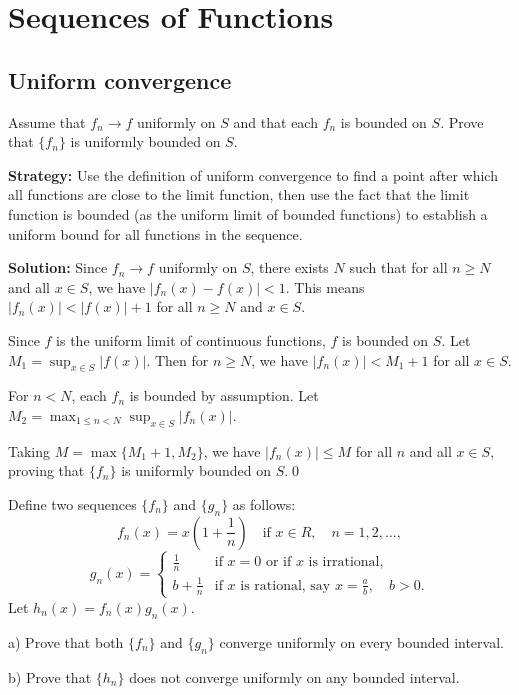 \chapter{Sequences of Functions}

\section{Uniform convergence}



\begin{problembox}
Assume that \( f_n \to f \) uniformly on \( S \) and that each \( f_n \) is bounded on \( S \). Prove that \(\{f_n\}\) is uniformly bounded on \( S \).
\end{problembox}

\noindent\textbf{Strategy:} Use the definition of uniform convergence to find a point after which all functions are close to the limit function, then use the fact that the limit function is bounded (as the uniform limit of bounded functions) to establish a uniform bound for all functions in the sequence.

\bigskip\noindent\textbf{Solution:} Since \( f_n \to f \) uniformly on \( S \), there exists \( N \) such that for all \( n \geq N \) and all \( x \in S \), we have \( |f_n(x) - f(x)| < 1 \). This means \( |f_n(x)| < |f(x)| + 1 \) for all \( n \geq N \) and \( x \in S \).

Since \( f \) is the uniform limit of continuous functions, \( f \) is bounded on \( S \). Let \( M_1 = \sup_{x \in S} |f(x)| \). Then for \( n \geq N \), we have \( |f_n(x)| < M_1 + 1 \) for all \( x \in S \).

For \( n < N \), each \( f_n \) is bounded by assumption. Let \\ \( M_2 = \max_{1 \leq n < N} \sup_{x \in S} |f_n(x)| \).

Taking \( M = \max\{M_1 + 1, M_2\} \), we have \( |f_n(x)| \leq M \) for all \( n \) and all \( x \in S \), proving that \(\{f_n\}\) is uniformly bounded on \( S \).\qed


\begin{problembox}
Define two sequences \(\{f_n\}\) and \(\{g_n\}\) as follows:
\[f_n(x) = x \left( 1 + \frac{1}{n} \right) \quad \text{if } x \in R, \quad n = 1, 2, \ldots,\]
\[g_n(x) = 
\begin{cases}
\frac{1}{n} & \text{if } x = 0 \text{ or if } x \text{ is irrational,} \\
b + \frac{1}{n} & \text{if } x \text{ is rational, say } x = \frac{a}{b}, \quad b > 0.
\end{cases}\]
Let \( h_n(x) = f_n(x) g_n(x) \).

a) Prove that both \(\{f_n\}\) and \(\{g_n\}\) converge uniformly on every bounded interval.

b) Prove that \(\{h_n\}\) does not converge uniformly on any bounded interval.
\end{problembox}


